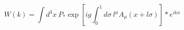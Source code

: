 \begin{equation}
  W(k) = \int d^3 x~ P_* \exp \left[ ig \int_0^1 d \sigma~
         l^\mu A_\mu (x + l \sigma) \right] \ast e^{ikx}
\end{equation}

